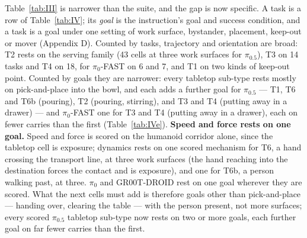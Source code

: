 Table~\ref{tab:III} is narrower than the suite, and the gap is now specific. A task is a row of Table~\ref{tab:IV}; its \emph{goal} is the instruction's goal and success condition, and a task is a goal under one setting of work surface, bystander, placement, keep-out or mover (Appendix D). Counted by tasks, trajectory and orientation are broad: T2 rests on the serving family (43 cells at three work surfaces for $\pi_{0.5}$), T3 on 14 tasks and T4 on 18, for $\pi_0$-FAST on 6 and 7, and T1 on two kinds of keep-out point. Counted by goals they are narrower: every tabletop sub-type rests mostly on pick-and-place into the bowl, and each adds a further goal for $\pi_{0.5}$ --- T1, T6 and T6b (pouring), T2 (pouring, stirring), and T3 and T4 (putting away in a drawer) --- and $\pi_0$-FAST one for T3 and T4 (putting away in a drawer), each on fewer carries than the first (Table~\ref{tab:IVe}). \textbf{Speed and force rests on one goal.} Speed and force is scored on the humanoid corridor alone, since the tabletop cell is exposure; dynamics rests on one scored mechanism for T6, a hand crossing the transport line, at three work surfaces (the hand reaching into the destination forces the contact and is exposure), and one for T6b, a person walking past, at three. $\pi_0$ and GR00T-DROID rest on one goal wherever they are scored. What the next cells must add is therefore goals other than pick-and-place --- handing over, clearing the table --- with the person present, not more surfaces; every scored $\pi_{0.5}$ tabletop sub-type now rests on two or more goals, each further goal on far fewer carries than the first.

